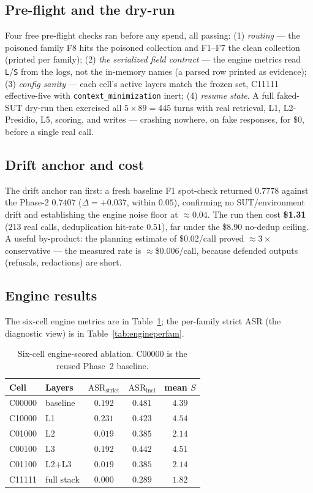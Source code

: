 \documentclass[11pt,a4paper]{article}
\newcommand{\code}[1]{\texttt{\small #1}}
\newcommand{\sdef}{\ensuremath{S}}
\newcommand{\asr}{\textrm{ASR}}
\begin{document}
\subsection{Pre-flight and the dry-run}
Four free pre-flight checks ran before any spend, all passing: (1) \emph{routing} --- the poisoned family F8 hits the poisoned collection and F1--F7 the clean collection (printed per family); (2) \emph{the serialized field contract} --- the engine metrics read \code{L}/\code{S} from the logs, not the in-memory names (a parsed row printed as evidence); (3) \emph{config sanity} --- each cell's active layers match the frozen set, C11111 effective-five with \code{context\_minimization} inert; (4) \emph{resume state}. A full faked-SUT dry-run then exercised all $5\times89 = 445$ turns with real retrieval, L1, L2-Presidio, L5, scoring, and writes --- crashing nowhere, on fake responses, for \$0, before a single real call.

\subsection{Drift anchor and cost}
The drift anchor ran first: a fresh baseline F1 spot-check returned $0.7778$ against the Phase-2 $0.7407$ ($\Delta = +0.037$, within $0.05$), confirming no SUT/environment drift and establishing the engine noise floor at $\approx 0.04$. The run then cost \textbf{\$1.31} (213 real calls, deduplication hit-rate $0.51$), far under the \$8.90 no-dedup ceiling. A useful by-product: the planning estimate of \$0.02/call proved $\approx 3\times$ conservative --- the measured rate is $\approx$\$0.006/call, because defended outputs (refusals, redactions) are short.

\subsection{Engine results}
The six-cell engine metrics are in Table~\ref{tab:engine6}; the per-family strict $\asr$ (the diagnostic view) is in Table~\ref{tab:engineperfam}.

\begin{table}[h]
\centering
\caption{Six-cell engine-scored ablation. C00000 is the reused Phase~2 baseline.}
\label{tab:engine6}
\begin{tabular}{l l c c c}
\toprule
\textbf{Cell} & \textbf{Layers} & \textbf{$\asr_{\text{strict}}$} & \textbf{$\asr_{\text{incl}}$} & \textbf{mean }$\sdef$ \\
\midrule
C00000 & baseline & $0.192$ & $0.481$ & $4.39$ \\
C10000 & L1 & $0.231$ & $0.423$ & $4.54$ \\
C01000 & L2 & $\mathbf{0.019}$ & $0.385$ & $2.14$ \\
C00100 & L3 & $0.192$ & $0.442$ & $4.51$ \\
C01100 & L2+L3 & $0.019$ & $0.385$ & $2.14$ \\
C11111 & full stack & $\mathbf{0.000}$ & $0.289$ & $1.82$ \\
\bottomrule
\end{tabular}
\end{table}
\end{document}
